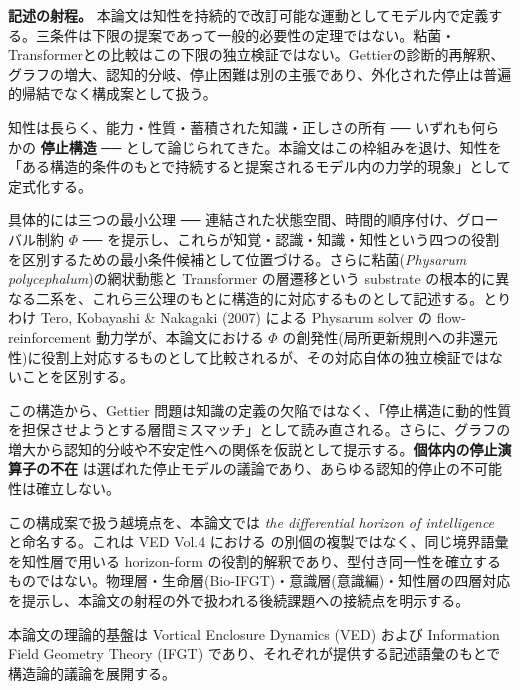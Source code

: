\noindent\textbf{記述の射程。} 本論文は知性を持続的で改訂可能な運動としてモデル内で定義する。三条件は下限の提案であって一般的必要性の定理ではない。粘菌・Transformerとの比較はこの下限の独立検証ではない。Gettierの診断的再解釈、グラフの増大、認知的分岐、停止困難は別の主張であり、外化された停止は普遍的帰結でなく構成案として扱う。

知性は長らく、能力・性質・蓄積された知識・正しさの所有 ── いずれも何らかの \textbf{停止構造} ── として論じられてきた。本論文はこの枠組みを退け、知性を「ある構造的条件のもとで持続すると提案されるモデル内の力学的現象」として定式化する。

具体的には三つの最小公理 ── 連結された状態空間、時間的順序付け、グローバル制約 $\Phi$ ── を提示し、これらが知覚・認識・知識・知性という四つの役割を区別するための最小条件候補として位置づける。さらに粘菌(\emph{Physarum polycephalum})の網状動態と Transformer の層遷移という substrate の根本的に異なる二系を、これら三公理のもとに構造的に対応するものとして記述する。とりわけ Tero, Kobayashi \& Nakagaki (2007) による Physarum solver の flow-reinforcement 動力学が、本論文における $\Phi$ の創発性(局所更新規則への非還元性)に役割上対応するものとして比較されるが、その対応自体の独立検証ではないことを区別する。

この構造から、Gettier 問題は知識の定義の欠陥ではなく、「停止構造に動的性質を担保させようとする層間ミスマッチ」として読み直される。さらに、グラフの増大から認知的分岐や不安定性への関係を仮説として提示する。\textbf{個体内の停止演算子の不在} は選ばれた停止モデルの議論であり、あらゆる認知的停止の不可能性は確立しない。

この構成案で扱う越境点を、本論文では \emph{the differential horizon of intelligence} と命名する。これは VED Vol.4 における \DH{} の別個の複製ではなく、同じ境界語彙を知性層で用いる horizon-form の役割的解釈であり、型付き同一性を確立するものではない。物理層・生命層(Bio-IFGT)・意識層(意識編)・知性層の四層対応を提示し、本論文の射程の外で扱われる後続課題への接続点を明示する。

本論文の理論的基盤は Vortical Enclosure Dynamics (VED) および Information Field Geometry Theory (IFGT) であり、それぞれが提供する記述語彙のもとで構造論的議論を展開する。
